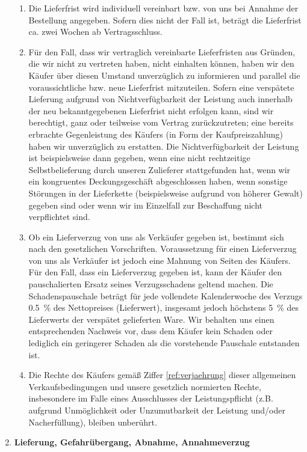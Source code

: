 \documentclass[%
    a4paper,%
    10pt,
]{scrartcl}
\begin{document}
\begin{multicols}{2}
\begin{enumerate}
\begin{enumerate}
         \item Die Lieferfrist wird individuell vereinbart bzw. von uns bei Annahme der Bestellung angegeben. Sofern dies nicht der Fall ist, beträgt die Lieferfrist ca. zwei Wochen ab Vertragsschluss.
         \item Für den Fall, dass wir vertraglich vereinbarte Lieferfristen aus Gründen, die wir nicht zu vertreten haben, nicht einhalten können, haben wir den Käufer über diesen Umstand unverzüglich zu informieren und parallel die voraussichtliche bzw. neue Lieferfrist mitzuteilen. Sofern eine verspätete Lieferung aufgrund von Nichtverfügbarkeit der Leistung auch innerhalb der neu bekanntgegebenen Lieferfrist nicht erfolgen kann, sind wir berechtigt, ganz oder teilweise vom Vertrag zurückzutreten; eine bereits erbrachte Gegenleistung des Käufers (in Form der Kaufpreiszahlung) haben wir unverzüglich zu erstatten. Die Nichtverfügbarkeit der Leistung ist beispielsweise dann gegeben, wenn eine nicht rechtzeitige Selbstbelieferung durch unseren Zulieferer stattgefunden hat, wenn wir ein kongruentes Deckungsgeschäft abgeschlossen haben, wenn sonstige Störungen in der Lieferkette (beispielsweise aufgrund von höherer Gewalt) gegeben sind oder wenn wir im Einzelfall zur Beschaffung nicht verpflichtet sind.
         \item Ob ein Lieferverzug von uns als Verkäufer gegeben ist, bestimmt sich nach den gesetzlichen Vorschriften. Voraussetzung für einen Lieferverzug von uns als Verkäufer ist jedoch eine Mahnung von Seiten des Käufers. Für den Fall, dass ein Lieferverzug gegeben ist, kann der Käufer den pauschalierten Ersatz seines Verzugsschadens geltend machen. Die Schadenspauschale beträgt für jede vollendete Kalenderwoche des Verzugs \qty{0.5}{\percent} des Nettopreises (Lieferwert), insgesamt jedoch höchstens \qty{5}{\percent} des Lieferwerts der verspätet gelieferten Ware. Wir behalten uns einen entsprechenden Nachweis vor, dass dem Käufer kein Schaden oder lediglich ein geringerer Schaden als die vorstehende Pauschale entstanden ist.
         \item Die Rechte des Käufers gemäß Ziffer \ref{ref:verjaehrung} dieser allgemeinen Verkaufsbedingungen und unsere gesetzlich normierten Rechte, insbesondere im Falle eines Ausschlusses der Leistungspflicht (z.B. aufgrund Unmöglichkeit oder Unzumutbarkeit der Leistung und/oder Nacherfüllung), bleiben unberührt.
        \end{enumerate}
        \item \textbf{Lieferung, Gefahrübergang, Abnahme, Annahmeverzug}%

\end{enumerate}
\end{multicols}
\end{document}
